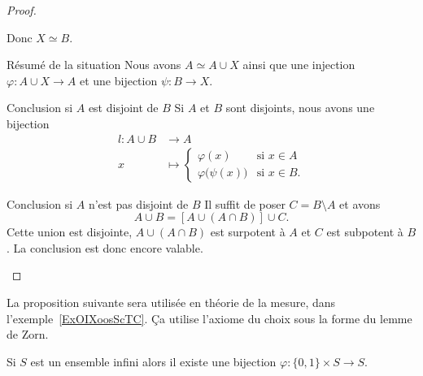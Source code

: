 \begin{proof}
\begin{subproof}
            Donc \( X\simeq B\).
        \item[Résumé de la situation]
            Nous avons \( A\simeq A\cup X\) ainsi que une injection \( \varphi\colon A\cup X\to A\) et une bijection \( \psi\colon B\to X\).
        \item[Conclusion si \( A\) est disjoint de \( B\)]
            Si \( A\) et \( B\) sont disjoints, nous avons une bijection
            \begin{equation}
                \begin{aligned}
                    l\colon A\cup B&\to A \\
                    x&\mapsto \begin{cases}
                        \varphi(x)    &   \text{si }  x\in A\\
                        \varphi\big( \psi(x) \big)    &    \text{si } x\in B.
                    \end{cases}
                \end{aligned}
            \end{equation}
        \item[Conclusion si \( A\) n'est pas disjoint de \( B\)]
            Il suffit de poser \( C=B\setminus A\) et avons
            \begin{equation}
                A\cup B=[A\cup (A\cap B)]\cup C.
            \end{equation}
            Cette union est disjointe, \( A\cup(A\cap B)\) est surpotent à \( A\) et \( C\) est subpotent à $B$. La conclusion est donc encore valable.
    \end{subproof}
\end{proof}

La proposition suivante sera utilisée en théorie de la mesure, dans l'exemple~\ref{ExOIXoosScTC}. Ça utilise l'axiome du choix sous la forme du lemme de Zorn.
\begin{proposition} \label{PropVCSooMzmIX}
    Si \( S\) est un ensemble infini alors il existe une bijection \( \varphi\colon \{ 0,1 \}\times S\to S\).
\end{proposition}

